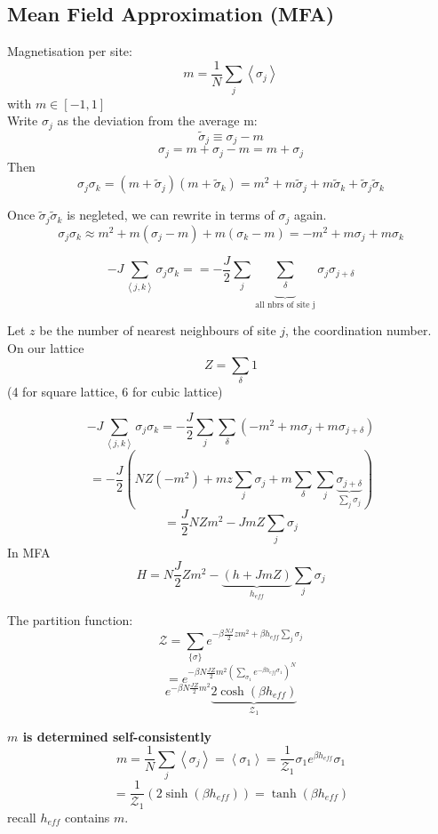 \documentclass[11pt]{book}
\theoremstyle{definition}
\begin{document}
\subsection{Mean Field Approximation (MFA)}
Magnetisation per site: 
\[ m = \frac{1}{N}\sum_j \left \langle \sigma_j \right \rangle  \] 
with $ m \in [-1,1] $ \\
Write $ \sigma_j $ as the deviation from the average m:
\[ \tilde \sigma_j \equiv \sigma_j - m \] 
\[ \sigma_j = m + \sigma_j - m = m + \sigma_j \] 
Then
\[ \sigma_j\sigma_k = (m + \tilde \sigma_j) (m+\tilde \sigma_k)  = m^2 + m \tilde \sigma_j + m \tilde \sigma_k + \tilde \sigma_j \tilde \sigma_k\] 

Once $ \tilde \sigma_j \tilde \sigma_k $ is negleted, we can rewrite in terms of $ \sigma_j $ again. \\
\[ \sigma_j \sigma_k \approx m^2 + m (\sigma_j - m) + m(\sigma_k-m) = -m^2 + m \sigma_j + m \sigma_k \] 

\[ -J \sum_{\left \langle j,k \right \rangle } \sigma_j \sigma_k = = - \frac{J}{2}\sum_j 
\underbrace{ \sum_{\delta}}_{\text{all nbrs of site j}} \sigma_j \sigma_{j+\delta} \] 

Let $ z $ be the number of nearest neighbours of site $ j $, the coordination number.\\ 
On our lattice
\[ Z = \sum_{\delta} 1 \] 
(4 for square lattice, 6 for cubic lattice)

\[ -J \sum_{\left \langle j,k \right \rangle } \sigma_j \sigma_k = -\frac{J}{2} \sum_j \sum_{\delta} (-m^2+m\sigma_j+m\sigma_{j+\delta})  \] 
\[ = -\frac{J}{2}\left( NZ(-m^2) + mz\sum_j \sigma_j + m\sum_{\delta}\sum_{j} \underbrace{\sigma_{j+\delta}}_{\sum_j \sigma_j} \right)  \] 
\[ = \frac{J}{2}NZm^2 - JmZ\sum_j \sigma_j \] 
In MFA
\[ H = N \frac{J}{2} Zm^2 - \underbrace{(h+JmZ)}_{h_{eff}} \sum_j \sigma_j \] 

The partition function:
\[ \mathcal{Z} = \sum_{\{\sigma\}} e^{-\beta  \frac{NJ}{2} zm^2 + \beta h_{eff} \sum_j \sigma_j }\] 
\[ = e^{-\beta N \frac{JZ}{2} m^2 \left( \sum_{\sigma_1} e^{-\beta h_{eff} \sigma_1} \right)^{N} } \] 
\[  e^{-\beta N \frac{JZ}{2} m^2} \underbrace{2\cosh(\beta h_{eff})}_{\mathcal{Z}_1}  \] 

\textbf{$ m $ is determined self-consistently} 
\[ m = \frac{1}{N}\sum_j \left \langle \sigma_j \right \rangle = \left \langle \sigma_1 \right \rangle = \frac{1}{\mathcal{Z}_1 } \sigma_1 e^{\beta h_{eff}} \sigma_1 \] 
\[  = \frac{1}{\mathcal{Z}_1} (2\sinh(\beta h_{eff})) = \tanh(\beta h_{eff})\] 
recall $ h_{eff} $ contains $ m $.
\end{document}
